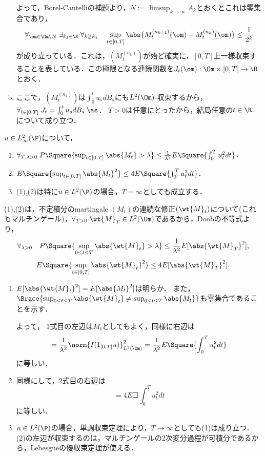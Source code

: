 \documentclass[uplatex,dvipdfmx]{jsreport}
\begin{document}
\begin{Proof}
\begin{enumerate}[(a)]
        よって，Borel-Cantelliの補題より，$N:=\limsup_{k\to\infty}A_k$とおくとこれは零集合であり，
        \[\forall_{\om\in\Om\setminus N}\;\exists_{k_1\in\N}\;\forall_{k\ge k_1}\quad\sup_{t\in[0,T]}\abs{M_t^{(n_{k+1})}(\om)-M_t^{(n_k)}(\om)}\le\frac{1}{2^k}\]
        が成り立っている．これは，$(M_t^{(n_k)})$が殆ど確実に，$[0,T]$上一様収束することを表している．この極限となる連続関数を$J_t(\om):\Om\times[0,T]\to\R$とおく．
        \item ここで，$(M_t^{(n_k)})$は$\int^t_0u_sdB_s$にも$L^2(\Om)$-収束するから，$\forall_{t\in[0,T]}\;J_t=\int^t_0u_sdB_s\;\as$．
        $T>0$は任意にとったから，結局任意の$t\in\R_+$について成り立つ．
    \end{enumerate}
\end{Proof}

\begin{corollary}[最大不等式]
    $u\in L_\infty^2(\P)$について，
    \begin{enumerate}
        \item $\forall_{T,\lambda>0}\;P\Square{\sup_{t\in[0,T]}\abs{M_t}>\lambda}\le\frac{1}{\lambda^2}E\Square{\int^T_0u^2_tdt}$．
        \item $E\Square{\sup_{t\in[0,T]}\abs{M_t}^2}\le 4E\Square{\int^T_0u^2_tdt}$．
        \item (1),(2)は特に$u\in L^2(\P)$の場合，$T=\infty$としても成立する．
    \end{enumerate}
\end{corollary}
\begin{Proof}
    (1),(2)は，不定積分のmartingale $(M_t)$の連続な修正$(\wt{M}_t)$について(これもマルチンゲール)，$\forall_{T>0}\;\wt{M}_T\in L^2(\Om)$であるから，Doobの不等式より，
    \[\forall_{\lambda>0}\quad P\Square{\sup_{0\le t\le T}\abs{\wt{M}_t}>\lambda}\le\frac{1}{\lambda^2}E[\abs{\wt{M}_T}^2],\]
    \[E\Square{\sup_{t\in[0,T]}\abs{\wt{M}_t}^2}\le 4E[\abs{\wt{M}_T}^2].\]
    \begin{enumerate}
        \item $E[\abs{\wt{M}_t}^2]=E[\abs{M_t}^2]$は明らか．
        また，$\Brace{\sup_{0\le t\le T}\abs{\wt{M} _t}\ne\sup_{0\le t\le T}\abs{M_t}}$も零集合であることを示す．
        
        よって，
        1式目の左辺は$M_t$としてもよく，同様に右辺は
        \[=\frac{1}{\lambda^2}\norm{I(1_{[0,T]}u)}_{L^2(\Om)}^2=\frac{1}{\lambda^2}E\Square{\int^T_0u_t^2dt}\]
        に等しい．
        \item 同様にして，2式目の右辺は
        \[=4E\Square{\int^T_0u_t^2dt}\]
        に等しい．
        \item $u\in L^2(\P)$の場合，単調収束定理により，$T\to\infty$としても(1)は成り立つ．
        (2)の左辺が収束するのは，マルチンゲールの2次変分過程が可積分であるから，Lebesgueの優収束定理が使える．
    \end{enumerate}
\end{Proof}
\end{document}
